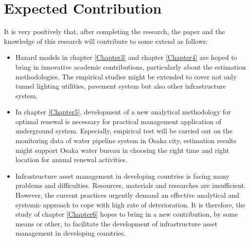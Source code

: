 \section{Expected Contribution}
It is very positively that, after completing the research, the paper and the knowledge of this research will contribute to some extend as follows:
\begin{itemize}
\item {Hazard models in chapter \ref{Chapter3} and chapter \ref{Chapter4} are hoped to bring in innovative academic contributions, particularly about the estimation methodologies. The empirical studies might be extended to cover not only tunnel lighting utilities, pavement system but also other infrastructure system.}
\item {In chapter \ref{Chapter5}, development of a new analytical methodology for optimal renewal is necessary for practical management application of underground system. Especially, empirical test will be carried out on the monitoring data of water pipeline system in Osaka city, estimation results might support Osaka water bureau in choosing the right time and right location for annual renewal activities.}
\item {Infrastructure asset management in developing countries is facing many problems and difficulties. Resources, materials and researches are insufficient. However, the current practices urgently demand an effective analytical and systemic approach to cope with high rate of deterioration. It is therefore, the study of chapter \ref{Chapter6} hopes to bring in a new contribution, by some means or other, to facilitate the development of infrastructure asset management in developing countries.}
\end{itemize}

